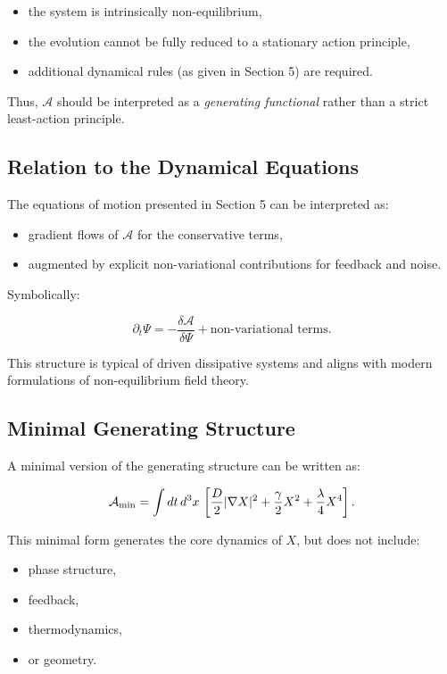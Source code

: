 \documentclass[11pt]{article}
\begin{document}
\begin{itemize}
\item the system is intrinsically non-equilibrium,
\item the evolution cannot be fully reduced to a stationary action principle,
\item additional dynamical rules (as given in Section 5) are required.
\end{itemize}

Thus, $\mathcal{A}$ should be interpreted as a \emph{generating functional} rather than a strict least-action principle.

\subsection{Relation to the Dynamical Equations}

The equations of motion presented in Section 5 can be interpreted as:

\begin{itemize}
\item gradient flows of $\mathcal{A}$ for the conservative terms,
\item augmented by explicit non-variational contributions for feedback and noise.
\end{itemize}

Symbolically:

\begin{equation}
\partial_t \Psi
=
- \frac{\delta \mathcal{A}}{\delta \Psi}
+
\text{non-variational terms}.
\end{equation}

This structure is typical of driven dissipative systems and aligns with modern formulations of non-equilibrium field theory.

\subsection{Minimal Generating Structure}

A minimal version of the generating structure can be written as:

\begin{equation}
\mathcal{A}_{\rm min}
=
\int dt \, d^3x \,
\left[
\frac{D}{2} |\nabla X|^2
+
\frac{\gamma}{2} X^2
+
\frac{\lambda}{4} X^4
\right].
\end{equation}

This minimal form generates the core dynamics of $X$, but does not include:

\begin{itemize}
\item phase structure,
\item feedback,
\item thermodynamics,
\item or geometry.
\end{itemize}
\end{document}
